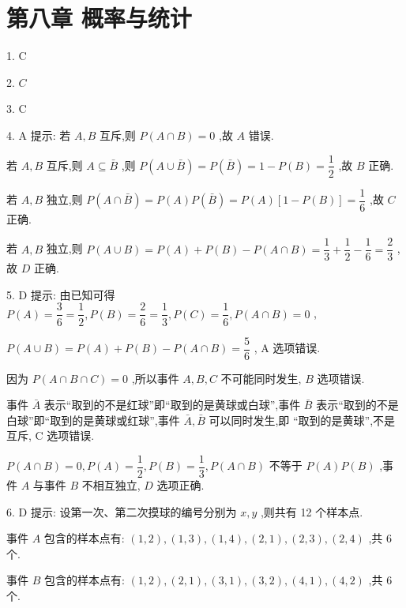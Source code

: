 \section*{第八章 概率与统计}

1. C

2. $C$

3. C

4. A 提示: 若 $A,B$ 互斥,则 $P\left( {A \cap  B}\right)  = 0$ ,故 $A$ 错误.

若 $A,B$ 互斥,则 $A \subseteq  \bar{B}$ ,则 $P\left( {A \cup  \bar{B}}\right)  = P\left( \bar{B}\right)  = 1 - P\left( B\right)  = \dfrac{1}{2}$ ,故 $B$ 正确.

若 $A,B$ 独立,则 $P\left( {A \cap  \bar{B}}\right)  = P\left( A\right) P\left( \bar{B}\right)  = P\left( A\right) \left\lbrack  {1 - P\left( B\right) }\right\rbrack   = \dfrac{1}{6}$ ,故 $C$ 正确.

若 $A,B$ 独立,则 $P\left( {A \cup  B}\right)  = P\left( A\right)  + P\left( B\right)  - P\left( {A \cap  B}\right)  = \dfrac{1}{3} + \dfrac{1}{2} - \dfrac{1}{6} = \dfrac{2}{3}$ ,故 $D$ 正确.

5. D 提示: 由已知可得 $P\left( A\right)  = \dfrac{3}{6} = \dfrac{1}{2},P\left( B\right)  = \dfrac{2}{6} = \dfrac{1}{3},P\left( C\right)  = \dfrac{1}{6},P\left( {A \cap  B}\right)  = 0$ ,

$P\left( {A \cup  B}\right)  = P\left( A\right)  + P\left( B\right)  - P\left( {A \cap  B}\right)  = \dfrac{5}{6}$ , A 选项错误.

因为 $P\left( {A \cap  B \cap  C}\right)  = 0$ ,所以事件 $A,B,C$ 不可能同时发生, $B$ 选项错误.

事件 $\bar{A}$ 表示“取到的不是红球”即“取到的是黄球或白球”,事件 $\bar{B}$ 表示“取到的不是白球”即“取到的是黄球或红球”,事件 $\bar{A},\bar{B}$ 可以同时发生,即 “取到的是黄球”,不是互斥, C 选项错误.

$P\left( {A \cap  B}\right)  = 0,P\left( A\right)  = \dfrac{1}{2},P\left( B\right)  = \dfrac{1}{3},P\left( {A \cap  B}\right)$ 不等于 $P\left( A\right) P\left( B\right)$ ,事件 $A$ 与事件 $B$ 不相互独立, $D$ 选项正确.

6. D 提示: 设第一次、第二次摸球的编号分别为 $x,y$ ,则共有 12 个样本点.

事件 $A$ 包含的样本点有: $\left( {1,2}\right) ,\left( {1,3}\right) ,\left( {1,4}\right) ,\left( {2,1}\right) ,\left( {2,3}\right) ,\left( {2,4}\right)$ ,共 6 个.

事件 $B$ 包含的样本点有: $\left( {1,2}\right) ,\left( {2,1}\right) ,\left( {3,1}\right) ,\left( {3,2}\right) ,\left( {4,1}\right) ,\left( {4,2}\right)$ ,共 6 个.

